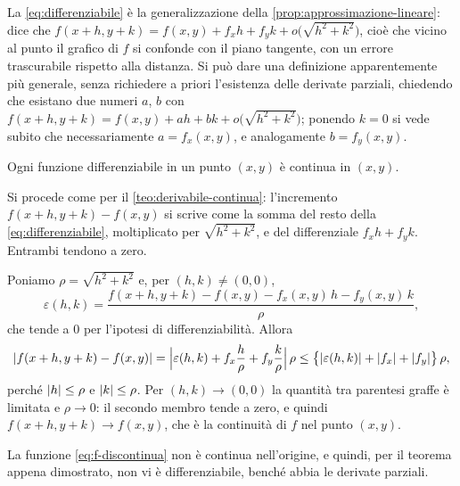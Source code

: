 La \eqref{eq:differenziabile} è la generalizzazione della
\cref{prop:approssimazione-lineare}: dice che
$f(x+h,y+k)=f(x,y)+f_{x}h+f_{y}k+o\bigl(\sqrt{h^{2}+k^{2}}\bigr)$, cioè che vicino al punto il
grafico di $f$ si confonde con il piano tangente, con un errore trascurabile rispetto alla
distanza. Si può dare una definizione apparentemente più generale, senza richiedere a
priori l'esistenza delle derivate parziali, chiedendo che esistano due numeri $a$, $b$
con $f(x+h,y+k)=f(x,y)+ah+bk+o\bigl(\sqrt{h^{2}+k^{2}}\bigr)$; ponendo $k=0$ si vede subito che
necessariamente $a=f_{x}(x,y)$, e analogamente $b=f_{y}(x,y)$.

\begin{teorema}\label{teo:differenziabile-continua}
Ogni funzione differenziabile in un punto $(x,y)$ è continua in $(x,y)$.
\end{teorema}

\begin{schema}
\end{schema}

\begin{strategia}
Si procede come per il \cref{teo:derivabile-continua}: l'incremento $f(x+h,y+k)-f(x,y)$ si
scrive come la somma del resto della \eqref{eq:differenziabile}, moltiplicato per
$\sqrt{h^{2}+k^{2}}$, e del differenziale $f_{x}h+f_{y}k$. Entrambi tendono a zero.
\end{strategia}

\begin{dimostrazione}
Poniamo $\rho=\sqrt{h^{2}+k^{2}}$ e, per $(h,k)\neq(0,0)$,
\[
  \varepsilon(h,k)=\frac{f(x+h,y+k)-f(x,y)-f_{x}(x,y)\,h-f_{y}(x,y)\,k}{\rho},
\]
che tende a $0$ per l'ipotesi di differenziabilità. Allora
\[
  \lvert f(x+h,y+k)-f(x,y)\rvert=\Bigl|\varepsilon(h,k)+f_{x}\frac h\rho+f_{y}\frac k\rho\Bigr|\,\rho
  \le\bigl\{\lvert \varepsilon(h,k)\rvert+\lvert f_{x}\rvert+\lvert f_{y}\rvert\bigr\}\,\rho,
\]
perché $\lvert h\rvert\le\rho$ e $\lvert k\rvert\le\rho$. Per $(h,k)\to(0,0)$ la quantità tra parentesi
graffe è limitata e $\rho\to0$: il secondo membro tende a zero, e quindi
$f(x+h,y+k)\to f(x,y)$, che è la continuità di $f$ nel punto $(x,y)$.
\end{dimostrazione}

La funzione \eqref{eq:f-discontinua} non è continua nell'origine, e quindi, per il
teorema appena dimostrato, non vi è differenziabile, benché abbia le derivate parziali.

